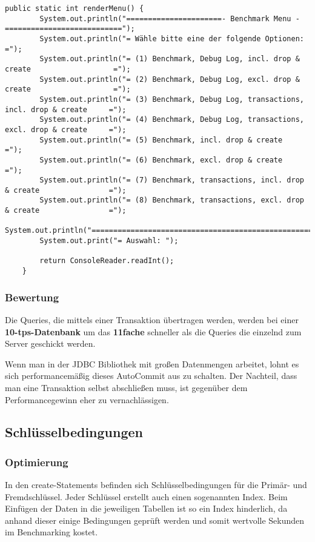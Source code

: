 \begin{lstlisting}[caption={Renderer für das Konsolen Menü}]
	public static int renderMenu() {
		System.out.println("======================- Benchmark Menu -===========================");
		System.out.println("= Wähle bitte eine der folgende Optionen:                         =");
		System.out.println("= (1) Benchmark, Debug Log, incl. drop & create                   =");
		System.out.println("= (2) Benchmark, Debug Log, excl. drop & create                   =");
		System.out.println("= (3) Benchmark, Debug Log, transactions, incl. drop & create     =");
		System.out.println("= (4) Benchmark, Debug Log, transactions, excl. drop & create     =");
		System.out.println("= (5) Benchmark, incl. drop & create                              =");
		System.out.println("= (6) Benchmark, excl. drop & create                              =");
		System.out.println("= (7) Benchmark, transactions, incl. drop & create                =");
		System.out.println("= (8) Benchmark, transactions, excl. drop & create                =");
		System.out.println("===================================================================");
		System.out.print("= Auswahl: ");
		
		return ConsoleReader.readInt();
	}
\end{lstlisting}

\subsubsection*{Bewertung}
Die Queries, die mittels einer Transaktion übertragen werden, werden bei
einer \textbf{10-tps-Datenbank} um \ca das \textbf{11fache} schneller als die
Queries die einzelnd zum Server geschickt werden. 

Wenn man in der JDBC Bibliothek mit großen Datenmengen arbeitet, lohnt es sich
performancemäßig dieses AutoCommit aus zu schalten. Der Nachteil, dass man eine
Transaktion selbst abschließen muss, ist gegenüber dem Performancegewinn eher zu
vernachlässigen.
\clearpage


\subsection{Schlüsselbedingungen}
\subsubsection*{Optimierung}
In den create-Statements befinden sich Schlüsselbedingungen für die Primär- und
Fremdschlüssel. Jeder Schlüssel erstellt auch einen sogenannten Index. Beim Einfügen
der Daten in die jeweiligen Tabellen ist so ein Index hinderlich, da anhand
dieser einige Bedingungen geprüft werden und somit wertvolle Sekunden im
Benchmarking kostet.

